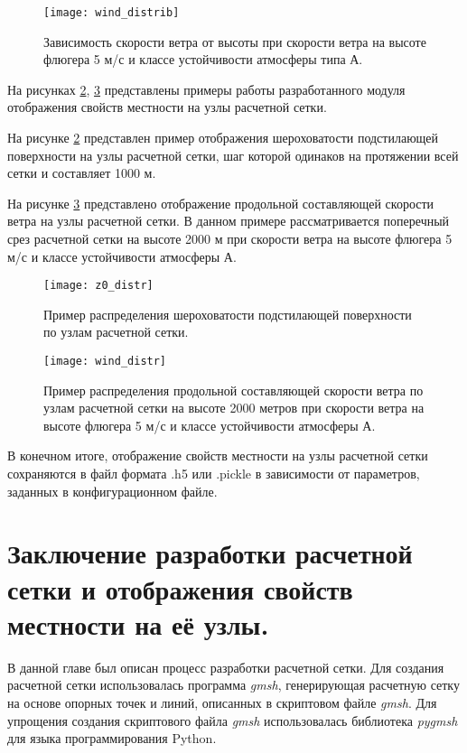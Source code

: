 \begin{figure}[ht]
    \centering
    \texttt{[image: wind\_distrib]}
    \captionsetup{justification=centering}
    \caption{Зависимость скорости ветра от высоты при скорости ветра на высоте флюгера 5 м/с и классе устойчивости 
        атмосферы типа А.}
    \label{fig_wind_distrib}
\end{figure}

На рисунках \ref{fig_z0_distrib}, \ref{fig_wind_distrib} представлены примеры работы разработанного модуля отображения 
свойств местности на узлы расчетной сетки. 

На рисунке \ref{fig_z0_distrib} представлен пример отображения шероховатости подстилающей поверхности на узлы расчетной 
сетки, шаг которой одинаков на протяжении всей сетки и составляет 1000 м.

На рисунке \ref{fig_wind_distrib} представлено отображение продольной составляющей скорости ветра на узлы расчетной сетки. 
В данном примере рассматривается поперечный срез расчетной сетки на высоте 2000 м при скорости ветра на высоте флюгера 
5 м/с и классе устойчивости атмосферы А.

\begin{figure}[ht]
    \centering
    \texttt{[image: z0\_distr]}
    \captionsetup{justification=centering}
    \caption{Пример распределения шероховатости подстилающей поверхности по узлам расчетной сетки.}
    \label{fig_z0_distrib}
\end{figure}

\begin{figure}[ht]
    \centering
    \texttt{[image: wind\_distr]}
    \captionsetup{justification=centering}
    \caption{Пример распределения продольной составляющей скорости ветра по узлам расчетной сетки на высоте 2000 метров 
        при скорости ветра на высоте флюгера 5 м/с и классе устойчивости атмосферы А.}
    \label{fig_wind_distrib}
\end{figure}

В конечном итоге, отображение свойств местности на узлы расчетной сетки сохраняются в файл формата .h5 или .pickle в 
зависимости от параметров, заданных в конфигурационном файле. 

\section{Заключение разработки расчетной сетки и отображения свойств местности на её узлы.}

В данной главе был описан процесс разработки расчетной сетки. Для создания расчетной сетки использовалась программа 
\textit{gmsh}, генерирующая расчетную сетку на основе опорных точек и линий, описанных в скриптовом файле \textit{gmsh}. 
Для упрощения создания скриптового файла \textit{gmsh} использовалась библиотека \textit{pygmsh} для языка 
программирования Python. 

